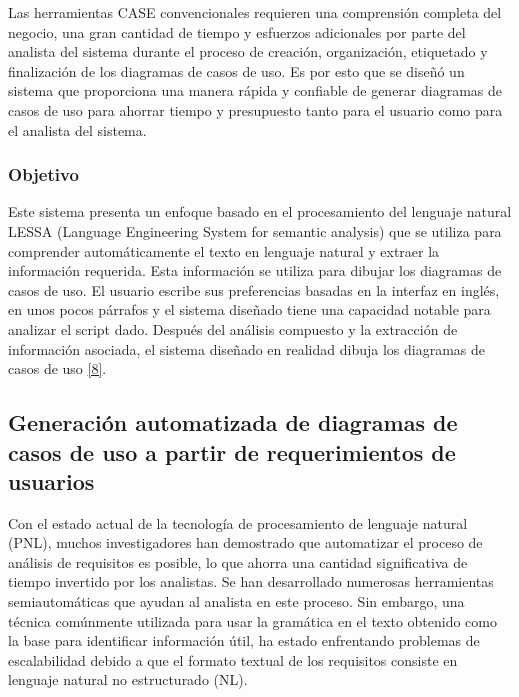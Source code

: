 Las herramientas CASE convencionales requieren una comprensión completa del negocio, una gran cantidad de tiempo y esfuerzos adicionales por parte del analista del sistema durante el proceso de creación, organización, etiquetado y finalización de los diagramas de casos de uso. Es por esto que se diseñó un sistema que proporciona una manera rápida y confiable de generar diagramas de casos de uso para ahorrar tiempo y presupuesto tanto para el usuario como para el analista del sistema.

\subsubsection{Objetivo}
Este sistema presenta un enfoque basado en el procesamiento del lenguaje natural LESSA (Language Engineering System for semantic analysis) que se utiliza para comprender automáticamente el texto en lenguaje natural y extraer la información requerida. Esta información se utiliza para dibujar los diagramas de casos de uso. El usuario escribe sus preferencias basadas en la interfaz en inglés, en unos pocos párrafos y el sistema diseñado tiene una capacidad notable para analizar el script dado. Después del análisis compuesto y la extracción de información asociada, el sistema diseñado en realidad dibuja los diagramas de casos de uso \hyperlink{b08}{[8]}.  

\subsection{Generación automatizada de diagramas de casos de uso a partir de requerimientos de usuarios}

Con el estado actual de la tecnología de procesamiento de lenguaje natural (PNL), muchos investigadores han demostrado que automatizar el proceso de análisis de requisitos es posible, lo que ahorra una cantidad significativa de tiempo invertido por los analistas. Se han desarrollado numerosas herramientas semiautomáticas que ayudan al analista en este proceso. Sin embargo, una técnica comúnmente utilizada para usar la gramática en el texto obtenido como la base para identificar información útil, ha estado enfrentando problemas de escalabilidad debido a que el formato textual de los requisitos consiste en lenguaje natural no estructurado (NL). 

